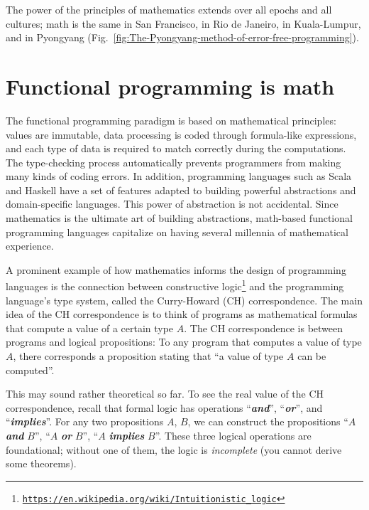 The power of the principles of mathematics extends over all epochs
and all cultures; math is the same in San Francisco, in Rio de Janeiro,
in Kuala-Lumpur, and in Pyongyang (Fig.\ \ref{fig:The-Pyongyang-method-of-error-free-programming}).

\section{Functional programming is math}

The functional programming paradigm is based on mathematical principles:
values are immutable, data processing is coded through formula-like
expressions, and each type of data is required to match correctly
during the computations. The type-checking process automatically prevents
programmers from making many kinds of coding errors. In addition,
programming languages such as Scala and Haskell have a set of features
adapted to building powerful abstractions and domain-specific languages.
This power of abstraction is not accidental. Since mathematics is
the ultimate art of building abstractions, math-based functional programming
languages capitalize on having several millennia of mathematical experience.

A prominent example of how mathematics informs the design of programming
languages is the connection between constructive logic\footnote{\texttt{\href{https://en.wikipedia.org/wiki/Intuitionistic_logic}{https://en.wikipedia.org/wiki/Intuitionistic\_logic}}}
and the programming language\textsf{'}s type system, called the Curry-Howard
(CH) correspondence. The main idea of the CH correspondence
is to think of programs as mathematical formulas that compute a value
of a certain type $A$. The CH correspondence is between programs
and logical propositions: To any program that computes a value of
type $A$, there corresponds a proposition stating that \textsf{``}a value
of type $A$ can be computed\textsf{''}.

This may sound rather theoretical so far. To see the real value of
the CH correspondence, recall that formal logic has operations \textsf{``}\textbf{\emph{and}}\textsf{''},
\textsf{``}\textbf{\emph{or}}\textsf{''}, and \textsf{``}\textbf{\emph{implies}}\textsf{''}. For any
two propositions $A$, $B$, we can construct the propositions \textsf{``}$A$
\textbf{\emph{and}} $B$\textsf{''}, \textsf{``}$A$ \textbf{\emph{or}} $B$\textsf{''}, \textsf{``}$A$
\textbf{\emph{implies}} $B$\textsf{''}. These three logical operations are
foundational; without one of them, the logic is \emph{incomplete}
(you cannot derive some theorems).

